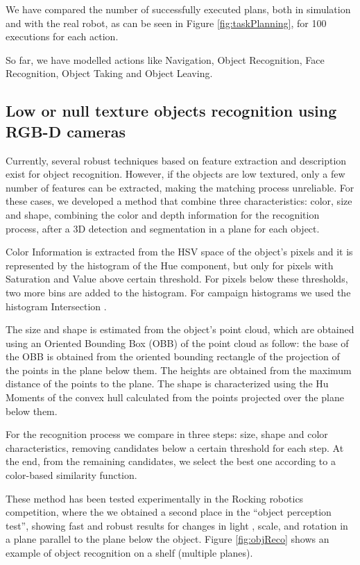\documentclass{llncs}
\begin{document}
We have compared the number of successfully executed plans, both in simulation and with the real robot, as can be seen in Figure \ref{fig:taskPlanning}, for 100 executions for each action.

So far, we have modelled actions like Navigation, Object Recognition, Face Recognition, Object Taking and Object Leaving.

\subsection{Low or null texture objects recognition using RGB-D cameras}\label{subsec:objDet}

Currently, several robust techniques based on feature extraction and description exist for object recognition. However, if the objects are low textured, only a few number of features can be extracted, making the matching process unreliable. For these cases, we developed a method that combine three characteristics: color, size and shape, combining the color and depth information for the recognition process, after a 3D detection and segmentation in a plane for each object.

Color Information is extracted from the HSV space of the object's pixels and it is represented by the histogram of the Hue component, but only for pixels with Saturation and Value above certain threshold. For pixels below these thresholds, two more bins are added to the histogram. For campaign histograms we used the histogram Intersection \cite{swain1991_HistoInter}.

The size and shape is estimated from the object's point cloud, which are obtained using an Oriented Bounding Box (OBB) of the point cloud as follow: the base of the OBB is obtained from the oriented bounding rectangle of the projection of the points in the plane below them. The heights are obtained from the maximum distance of the points to the plane. The shape is characterized using the Hu Moments \cite{hu1962_moments} of the convex hull calculated from the points projected over the plane below them. 

For the recognition process we compare in three steps: size, shape and color characteristics, removing candidates below a certain threshold for each step. At the end, from the remaining candidates, we select the best one according to a color-based similarity function. 

These method has been tested experimentally in the Rocking robotics competition, where the we obtained a second place in the ``object perception test'', showing fast and robust results for changes in light , scale, and rotation in a plane parallel to the plane below the object. Figure \ref{fig:objReco} shows an example of object recognition on a shelf (multiple planes).
\end{document}

